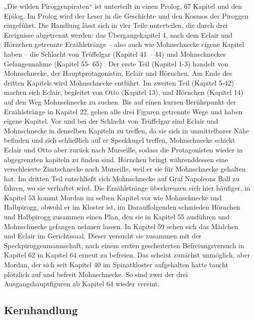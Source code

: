 {„Die wilden Piroggenpiraten“ ist unterteilt in einen Prolog, 67 Kapitel und den Epilog. Im Prolog wird der Leser in die Geschichte und den Kosmos der Piroggen eingeführt. Die Handlung lässt sich in vier Teile unterteilen, die durch drei Ereignisse abgetrennt werden: das Übergangskapitel 4, nach dem Eclair und Hörnchen getrennte Erzählstränge – also auch wie Mohnschnecke eigene Kapitel haben – die Schlacht von Trüffelgar (Kapitel 41 – 44) und Mohnschneckes Gefangennahme (Kapitel 55- 65) . Der erste Teil (Kapitel 1-3) handelt von Mohnschnecke, der Hauptprotagonistin, Eclair und Hörnchen. Am Ende des dritten Kapitels wird Mohnschnecke entführt. Im zweiten Teil (Kapitel 5-42) machen sich Eclair, begleitet von Otto (Kapitel 13), und Hörnchen (Kapitel 14) auf den Weg Mohnschnecke zu suchen. Bis auf einen kurzen Berührpunkt der Erzählstränge in Kapitel 22, gehen alle drei Figuren getrennte Wege und haben eigene Kapitel. Vor und bei der Schlacht von Trüffelgar sind Eclair und Mohnschnecke in denselben Kapiteln zu treffen, da sie sich in unmittelbarer Nähe befinden und sich schließlich auf er Speckkugel treffen,  Mohnschnecke schickt Eclair und Otto aber zurück nach Murseille, sodass die Protagonisten wieder in abgegrenzten kapiteln zu finden sind. Hörnchen bringt währenddessen eine verschleierte Zimtschnecke nach Murseille, weil er sie für Mohnschnecke gehalten hat. Im dritten Teil entschließt sich Mohnschnecke auf Graf Napoleons Ball zu fahren, wo sie verhaftet wird. Die Erzählstränge überkreuzen sich hier häufiger, in Kapitel 53 kommt Mordan im selben Kapitel vor wie Mohnschnecke und Halbpirogg, obwohl er im Kloster ist, im Darauffolgenden schmieden Hörnchen und Halbpirogg zusammen einen Plan, den sie in Kapitel 55 ausführen und Mohnschnecke gefangen nehmen lassen. In Kapitel 59 sehen sich das Mädchen und Eclair im Gerichtssaal. Dieser versucht sie zusammen mit der Speckpiroggenmannschaft, nach einem ersten gescheiterten Befreiungsversuch in Kapitel 62 in Kapitel 64 erneut zu befreien. Das scheint zunächst unmöglich, aber Mordan, der sich seit Kapitel 40 im Spinatkloster aufgehalten hatte taucht plötzlich auf und befreit Mohnschnecke. So sind zwei der drei Ausgangshauptfiguren ab Kapitel 64 wieder vereint.

\subsection{Kernhandlung}

}
